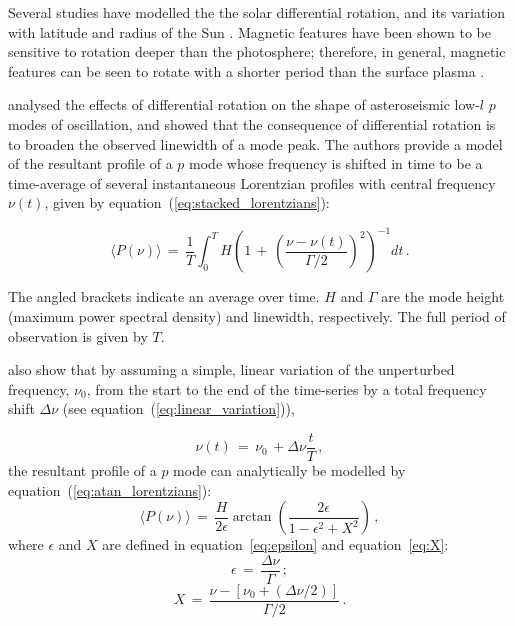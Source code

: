 Several studies have modelled the the solar differential rotation, and its variation with latitude and radius of the Sun \citep[see][for an in depth review of the literature on solar differential rotation]{beck_comparison_2000, howe_solar_2009}. Magnetic features have been shown to be sensitive to rotation deeper than the photosphere; therefore, in general, magnetic features can be seen to rotate with a shorter period than the surface plasma \citep{howe_solar_2009}.

\citet{chaplin_distortion_2008} analysed the effects of differential rotation on the shape of asteroseismic low-$l$ $p$ modes of oscillation, and showed that the consequence of differential rotation is to broaden the observed linewidth of a mode peak. The authors provide a model of the resultant profile of a $p$ mode whose frequency is shifted in time to be a time-average of several instantaneous Lorentzian profiles with central frequency $\nu(t)$, given by equation~(\ref{eq:stacked_lorentzians}):

\begin{equation}
\langle P(\nu) \rangle \, = \, \frac{1}{T} \int^T_0 H \left( 1 \, + \, \left( \frac{\nu - \nu(t)}{\Gamma /2} \right)^2 \right)^{-1} dt \, .
\label{eq:stacked_lorentzians}
\end{equation}

The angled brackets indicate an average over time. $H$ and $\Gamma$ are the mode height (maximum power spectral density) and linewidth, respectively. The full period of observation is given by $T$.

\citet{chaplin_distortion_2008} also show that by assuming a simple, linear variation of the unperturbed frequency, $\nu_0$, from the start to the end of the time-series by a total frequency shift $\Delta\nu$ (see equation~(\ref{eq:linear_variation})),

\begin{equation}
\nu(t) \, = \, \nu_0 \, +  \Delta\nu \frac{t}{T} \, ,
\label{eq:linear_variation}
\end{equation}
%
the resultant profile of a $p$ mode can analytically be modelled by equation~(\ref{eq:atan_lorentzians}):
%
\begin{equation}
\langle P(\nu) \rangle \, = \, \frac{H}{2\epsilon} \arctan \left( \frac{2 \epsilon}{1 - \epsilon^2 + X^2 } \right) \, ,
\label{eq:atan_lorentzians}
\end{equation}
%
where $\epsilon$ and $X$ are defined in equation~\ref{eq:epsilon} and equation~\ref{eq:X}:
%
\begin{equation}
\epsilon \, = \, \frac{\Delta\nu}{\Gamma} \, ;
\label{eq:epsilon}
\end{equation}
%
\begin{equation}
X \, = \, \frac{\nu - [\nu_0 + (\Delta\nu/2)]}{\Gamma /2} \, .
\label{eq:X}
\end{equation}

